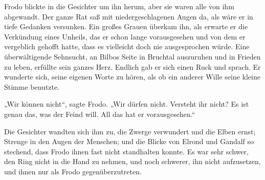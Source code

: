 Frodo blickte in die Gesichter um ihn herum, aber sie waren alle von ihm abgewandt. Der ganze Rat saß mit niedergeschlagenen Augen da, als wäre er in tiefe Gedanken versunken. Ein großes Grauen überkam ihn, als erwarte er die Verkündung eines Unheils, das er schon lange vorausgesehen und von dem er vergeblich gehofft hatte, dass es vielleicht doch nie ausgesprochen würde. Eine überwältigende Sehnsucht, an Bilbos Seite in Bruchtal auszuruhen und in Frieden zu leben, erfüllte sein ganzes Herz. Endlich gab er sich einen Ruck und sprach. Er wunderte sich, seine eigenen Worte zu hören, als ob ein anderer Wille seine kleine Stimme benutzte.

„Wir können nicht“, sagte Frodo.
„Wir dürfen nicht. Versteht ihr nicht? Es ist genau das, was der Feind will. All das hat er vorausgesehen.“

Die Gesichter wandten sich ihm zu, die Zwerge verwundert und die Elben ernst; Strenge in den Augen der Menschen; und die Blicke von Elrond und Gandalf so stechend, dass Frodo ihnen fast nicht standhalten konnte. Es war sehr schwer, den Ring nicht in die Hand zu nehmen, und noch schwerer, ihn nicht aufzusetzen, und ihnen nur als Frodo gegenüberzutreten.

